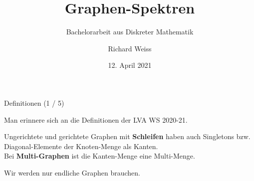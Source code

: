 \documentclass[aspectratio=169]{beamer}
\title[Graphen-Spektren]{Graphen-Spektren}
\subtitle{Bachelorarbeit aus Diskreter Mathematik}
\author[R. Weiss]{Richard Weiss}
\institute[TU Wien]{TU Wien, Vienna, Austria}
\date{12. April 2021}
\begin{document}
\begin{frame}
  \titlepage
\end{frame}      


\begin{frame}{Definitionen (1 / 5)}

  Man erinnere sich an die Definitionen der LVA  WS 2020-21.

  \begin{definition*}
    Ungerichtete und gerichtete Graphen mit \textbf{Schleifen} haben auch Singletons bzw. Diagonal-Elemente der Knoten-Menge als Kanten. \\
    Bei \textbf{Multi-Graphen} ist die Kanten-Menge eine Multi-Menge.
  \end{definition*}

  Wir werden nur endliche Graphen brauchen.

\end{frame}
\end{document}
